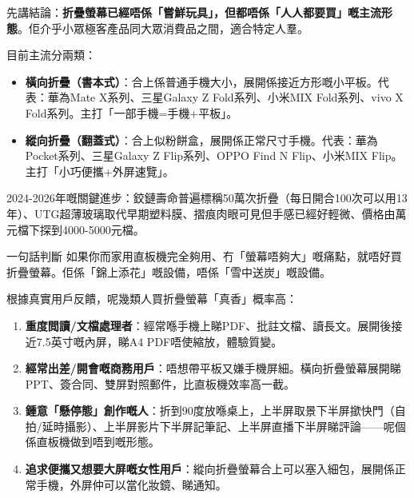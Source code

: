 


先講結論：\textbf{折疊螢幕已經唔係「嘗鮮玩具」，但都唔係「人人都要買」嘅主流形態}。佢介乎小眾極客產品同大眾消費品之間，適合特定人羣。

目前主流分兩類：

\begin{itemize}
  \item \textbf{橫向折疊（書本式）}：合上係普通手機大小，展開係接近方形嘅小平板。代表：華為Mate X系列、三星Galaxy Z Fold系列、小米MIX Fold系列、vivo X Fold系列。主打「一部手機=手機+平板」。
  \item \textbf{縱向折疊（翻蓋式）}：合上似粉餅盒，展開係正常尺寸手機。代表：華為Pocket系列、三星Galaxy Z Flip系列、OPPO Find N Flip、小米MIX Flip。主打「小巧便攜+外屏速覽」。
\end{itemize}

2024-2026年嘅關鍵進步：鉸鏈壽命普遍標稱50萬次折疊（每日開合100次可以用13年）、UTG超薄玻璃取代早期塑料膜、摺痕肉眼可見但手感已經好輕微、價格由萬元檔下探到4000-5000元檔。

\begin{tcbinfo}{一句話判斷}
如果你而家用直板機完全夠用、冇「螢幕唔夠大」嘅痛點，就唔好買折疊螢幕。佢係「錦上添花」嘅設備，唔係「雪中送炭」嘅設備。

\end{tcbinfo}


根據真實用戶反饋，呢幾類人買折疊螢幕「真香」概率高：

\begin{enumerate}
  \item \textbf{重度閲讀/文檔處理者}：經常喺手機上睇PDF、批註文檔、讀長文。展開後接近7.5英寸嘅內屏，睇A4 PDF唔使縮放，體驗質變。
  \item \textbf{經常出差/開會嘅商務用戶}：唔想帶平板又嫌手機屏細。橫向折疊螢幕展開睇PPT、簽合同、雙屏對照郵件，比直板機效率高一截。
  \item \textbf{鍾意「懸停態」創作嘅人}：折到90度放喺桌上，上半屏取景下半屏撳快門（自拍/延時攝影）、上半屏影片下半屏記筆記、上半屏直播下半屏睇評論——呢個係直板機做到唔到嘅形態。
  \item \textbf{追求便攜又想要大屏嘅女性用戶}：縱向折疊螢幕合上可以塞入細包，展開係正常手機，外屏仲可以當化妝鏡、睇通知。
\end{enumerate}

